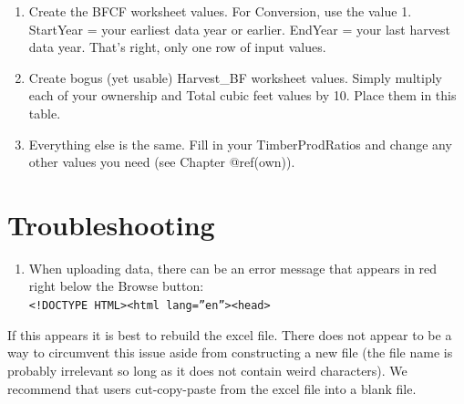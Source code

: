\documentclass[
  openany]{book}
\providecommand{\tightlist}{%
  \setlength{\itemsep}{0pt}\setlength{\parskip}{0pt}}
\begin{document}
\begin{enumerate}
\def\labelenumi{\arabic{enumi}.}
\tightlist
\item
  Create the BFCF worksheet values. For Conversion, use the value 1.
  StartYear = your earliest data year or earlier. EndYear = your last
  harvest data year. That's right, only one row of input values.\\
\item
  Create bogus (yet usable) Harvest\_BF worksheet values. Simply
  multiply each of your ownership and Total cubic feet values by 10.
  Place them in this table.\\
\item
  Everything else is the same. Fill in your TimberProdRatios and change
  any other values you need (see Chapter @ref(own)).
\end{enumerate}

\hypertarget{ft-trbl}{%
\section{Troubleshooting}\label{ft-trbl}}

\begin{enumerate}
\def\labelenumi{\arabic{enumi}.}
\tightlist
\item
  When uploading data, there can be an error message that appears in red
  right below the Browse button:\\
  \texttt{\textless{}!DOCTYPE\ HTML\textgreater{}\textless{}html\ lang=”en”\textgreater{}\textless{}head\textgreater{}}
\end{enumerate}

If this appears it is best to rebuild the excel file. There does not
appear to be a way to circumvent this issue aside from constructing a
new file (the file name is probably irrelevant so long as it does not
contain weird characters). We recommend that users cut-copy-paste from
the excel file into a blank file.
\end{document}
